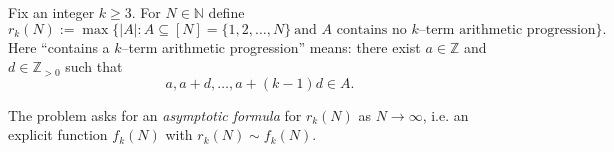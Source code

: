 Fix an integer $k\ge 3$.
For $N\in\mathbb{N}$ define
\[
 r_k(N) := \max\bigl\{ |A| : A\subseteq [N]=\{1,2,\dots,N\}\ \text{and $A$ contains no $k$--term arithmetic progression}\bigr\}.
\]
Here ``contains a $k$--term arithmetic progression'' means: there exist $a\in\mathbb{Z}$ and $d\in\mathbb{Z}_{>0}$ such that
\[
 a,a+d,\dots,a+(k-1)d \in A.
\]

The problem asks for an \emph{asymptotic formula} for $r_k(N)$ as $N\to\infty$, i.e. an explicit function $f_k(N)$ with
$r_k(N) \sim f_k(N)$.
